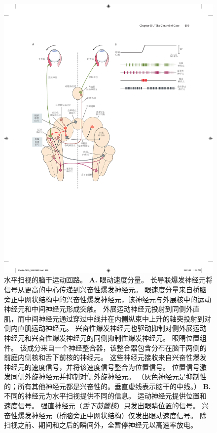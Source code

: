 \begin{figure}[htbp]
	\centering
	\includegraphics[width=1.0\linewidth]{chap35/fig_35_8}
	\caption{水平扫视的脑干运动回路。 
		\textbf{A.} 眼动速度分量。
		长导联爆发神经元将信号从更高的中心传递到兴奋性爆发神经元。
		眼速度分量来自桥脑旁正中网状结构中的兴奋性爆发神经元，该神经元与外展核中的运动神经元和中间神经元形成突触。
		外展运动神经元投射到同侧外直肌，而中间神经元通过穿过中线并在内侧纵束中上升的轴突投射到对侧内直肌运动神经元。
		兴奋性爆发神经元也驱动抑制对侧外展运动神经元和兴奋性爆发神经元的同侧抑制性爆发神经元。
		眼睛位置组件。
		该成分来自一个神经整合器，该整合器包含分布在脑干两侧的前庭内侧核和舌下前核的神经元。
		这些神经元接收来自兴奋性爆发神经元的速度信号，并将该速度信号整合为位置信号。
		位置信号激发同侧外旋神经元并抑制对侧外旋神经元。 （灰色神经元是抑制性的；所有其他神经元都是兴奋性的。垂直虚线表示脑干的中线。）
		\textbf{B.} 不同的神经元为水平扫视提供不同的信息。
		运动神经元提供位置和速度信号。
		强直神经元（\textit{舌下前置核}）只发出眼睛位置的信号。
		兴奋性爆发神经元（桥脑旁正中网状结构）仅发出眼动速度信号。
		除扫视之前、期间和之后的瞬间外，全暂停神经元以高速率放电。}
	\label{fig:35_8}
\end{figure}


